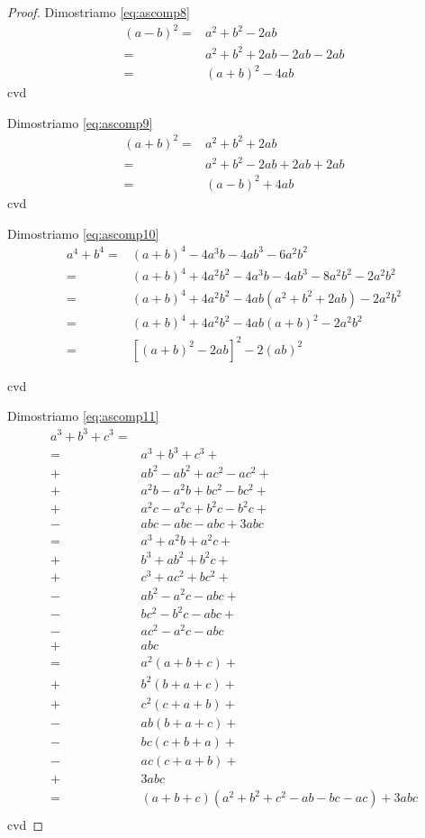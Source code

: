 \begin{proof}
Dimostriamo \ref{eq:ascomp8}
\begin{align*}
(a-b)^2=&a^2+b^2-2ab\\
=&a^2+b^2+2ab-2ab-2ab\\
=&{}(a+b)^2-4ab
\end{align*}
cvd

Dimostriamo \ref{eq:ascomp9}
\begin{align*}
(a+b)^2=&a^2+b^2+2ab\\
=&a^2+b^2-2ab+2ab+2ab\\
=&{}(a-b)^2+4ab
\end{align*}
cvd

Dimostriamo \ref{eq:ascomp10}
\begin{align*}
a^4+b^4=&{}(a+b)^4-4a^3b-4ab^3-6a^2b^2\\
=&{}(a+b)^4+4a^2b^2-4a^3b-4ab^3-8a^2b^2-2a^2b^2\\
=&{}(a+b)^4+4a^2b^2-4ab(a^2+b^2+2ab)-2a^2b^2\\
=&{}(a+b)^4+4a^2b^2-4ab(a+b)^2-2a^2b^2\\
=&{}[(a+b)^2-2ab]^2-2(ab)^2
\end{align*}

cvd

Dimostriamo \ref{eq:ascomp11}
\begin{align*}
a^3+b^3+c^3=&\\
=&a^3+b^3+c^3+\\
+&ab^2-ab^2+ac^2-ac^2+\\
+&a^2b-a^2b+bc^2-bc^2+\\
+&a^2c-a^2c+b^2c-b^2c+\\
-&abc-abc-abc+3abc\\
=&a^3+a^2b+a^2c+\\
+&b^3+ab^2+b^2c+\\
+&c^3+ac^2+bc^2+\\
-&ab^2-a^2c-abc+\\
-&bc^2-b^2c-abc+\\
-&ac^2-a^2c-abc\\
+&abc\\
=&a^2(a+b+c)+\\
+&b^2(b+a+c)+\\
+&c^2(c+a+b)+\\
-&ab(b+a+c)+\\
-&bc(c+b+a)+\\
-&ac(c+a+b)+\\
+&3abc\\
=&{}(a+b+c)(a^2+b^2+c^2-ab-bc-ac)+3abc\\
\end{align*}
cvd


\end{proof}
